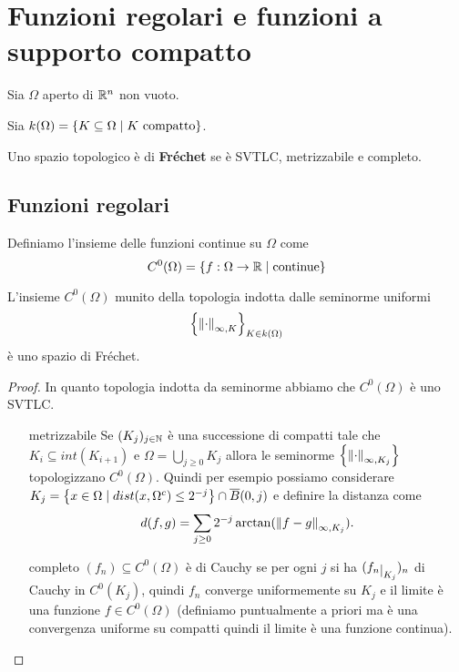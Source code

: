 \chapter{Funzioni regolari e funzioni a supporto compatto}

Sia $\Omega$ aperto di $\mathbb{R}^n$ non vuoto.
\begin{notation}
Sia $k(\Omega)=\left\{{K\subseteq \Omega\mid K\text{ compatto}}\right\}$. 
\end{notation}

\begin{definition}
Uno spazio topologico \`e di \textbf{Fr\'echet} se \`e SVTLC, metrizzabile e completo.
\end{definition}


\section{Funzioni regolari}
\begin{definition}
Definiamo l'insieme delle funzioni continue su $\Omega$ come
\[C^0(\Omega)=\left\{{f:\Omega\to\mathbb{R}\mid \text{continue}}\right\}\]
\end{definition}
\begin{proposition}\label{PrContinueSonoSpazioFrechet}
L'insieme $C^0(\Omega)$ munito della topologia indotta dalle seminorme uniformi
\[\left\{{{\left\Vert{\cdot}\right\Vert}_{\infty,K}}\right\}_{K\in k(\Omega)}\]
\`e uno spazio di Fr\'echet.
\end{proposition}
\begin{proof}
In quanto topologia indotta da seminorme abbiamo che $C^0(\Omega)$ \`e uno SVTLC.

\setlength{\leftmargini}{0cm}
\begin{itemize}
\item[$\boxed{\text{metrizzabile}}$] Se $(K_j)_{j\in\mathbb{N}}$ \`e una successione di compatti tale che $K_i\subseteq int(K_{i+1})$ e $\Omega=\bigcup_{j\geq 0}K_j$ allora le seminorme $\left\{{{\left\Vert{\cdot}\right\Vert}_{\infty,K_j}}\right\}$ topologizzano $C^0(\Omega)$. Quindi per esempio possiamo considerare $K_j=\left\{{x\in\Omega\mid dist(x,\Omega^c)\leq 2^{-j}}\right\}\cap \overline{B}(0,j)$ e definire la distanza come
\[d(f,g)=\sum_{j\geq 0}2^{-j}\arctan(\left\Vert{f-g}\right\Vert_{\infty,K_j}).\]
\item[$\boxed{\text{completo}}$] $(f_n)\subseteq C^0(\Omega)$ \`e di Cauchy se per ogni $j$ si ha $(f_n\res{K_j})_n$ di Cauchy in $C^0(K_j)$, quindi $f_n$ converge uniformemente su $K_j$ e il limite \`e una funzione $f\in C^0(\Omega)$ (definiamo puntualmente a priori ma \`e una convergenza uniforme su compatti quindi il limite \`e una funzione continua).
\end{itemize}
\setlength{\leftmargini}{0.5cm}
\end{proof}




